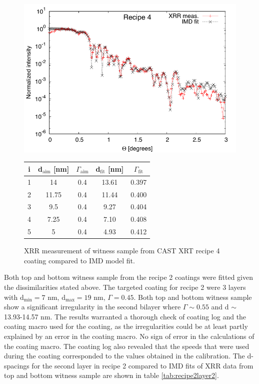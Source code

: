 \begin{figure}[h!]
\centering
\begin{minipage}{.47\textwidth}
  \centering
  \includegraphics[width=\linewidth]{figures/cast/cast_recipe4_fit.pdf}
\end{minipage}%
\begin{minipage}{.53\textwidth}
  \centering
  \footnotesize
\begin{tabular}{c|c|c|c|c}
i&d$_{\text{aim}}$ [nm]&$\Gamma_{\text{aim}}$&d$_{\text{fit}}$ [nm]&$\Gamma_{\text{fit}}$\\
\hline
1&14&0.4&13.61&0.397\\
2&11.75&0.4&11.44&0.400\\
3&9.5&0.4&9.27&0.404\\
4&7.25&0.4&7.10&0.408\\
5&5&0.4&4.93&0.412
\end{tabular}
\end{minipage}
\caption{\footnotesize XRR measurement of witness sample from CAST XRT recipe 4 coating compared to IMD model fit.}\label{fig:cast_fit_rec4}
\end{figure}

Both top and bottom witness sample from the recipe 2 coatings were fitted given the dissimilarities stated above. The targeted coating for recipe 2 were 3 layers with d$_{\text{min}}=7$ nm, d$_{\text{max}}=19$ nm, $\Gamma=0.45$. Both top and bottom witness sample show a significant irregularity in the second bilayer where $\Gamma \sim 0.55$ and d $\sim$ 13.93-14.57 nm. The results warranted a thorough check of coating log and the coating macro used for the coating, as the irregularities could be at least partly explained by an error in the coating macro. No sign of error in the calculations of the coating macro. The coating log also revealed that the speeds that were used during the coating corresponded to the values obtained in the calibration. The d-spacings for the second layer in recipe 2 compared to IMD fits of XRR data from top and bottom witness sample are shown in table \ref{tab:recipe2layer2}.

